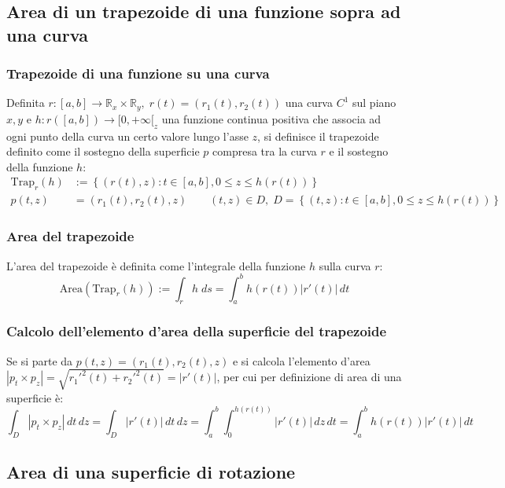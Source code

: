 \documentclass[a4paper]{article}
\newcommand\R{\mathbb{R}}     %
\begin{document}
\newpage

\subsection{Area di un trapezoide di una funzione sopra ad una curva}
\subsubsection*{Trapezoide di una funzione su una curva}
Definita \(r: [a,b] \to \R_x \times \R_y, \; r(t) = (r_1(t),r_2(t))\) una curva \(C^1\) sul piano \(x,y\) e \(h : r([a,b]) \to [0,+\infty[_z\)
una funzione continua positiva che associa ad ogni punto della curva un certo valore lungo l'asse \(z\), si definisce il trapezoide
definito come il sostegno della superficie \(p\) compresa tra la curva \(r\) e il sostegno della funzione \(h\):
\begin{align*}
	\text{Trap}_r(h) &:= \left\{(r(t),z) : t \in [a,b], 0 \leq z \leq h(r(t))\right\} \\
	p(t,z) &= (r_1(t), r_2(t), z) \qquad (t,z) \in D, \; D = \left\{(t,z) : t \in [a,b], 0 \leq z \leq h(r(t))\right\}
\end{align*}

\subsubsection*{Area del trapezoide}
L'area del trapezoide è definita come l'integrale della funzione \(h\) sulla curva \(r\):
\[\text{Area}(\text{Trap}_r(h)) := \int_r h \; ds = \int_a^b h(r(t)) \left|r'(t)\right| \, dt\]

\subsubsection*{Calcolo dell'elemento d'area della superficie del trapezoide}
Se si parte da \(p(t,z) = (r_1(t), r_2(t), z)\) e si calcola l'elemento d'area \(\left|p_t \times p_z\right| = \sqrt{{r_1'}^2(t) + {r_2'}^2(t)} = \left|r'(t)\right|\),
per cui per definizione di area di una superficie è:
\[\int_D \left|p_t \times p_z\right| \, dt \, dz = \int_D \left|r'(t)\right| \, dt \, dz = \int_a^b \int_0^{h(r(t))} \left|r'(t)\right| \, dz \, dt = \int_a^b h(r(t)) \left|r'(t)\right| \, dt\]

\subsection{Area di una superficie di rotazione}
\end{document}
